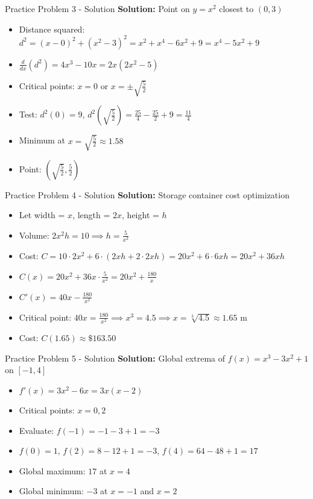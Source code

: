 \documentclass[aspectratio=169]{beamer}
\begin{document}
\begin{frame}{Practice Problem 3 - Solution}
\textbf{Solution:} Point on $y = x^2$ closest to $(0,3)$

\begin{itemize}
    \item Distance squared: $d^2 = (x-0)^2 + (x^2-3)^2 = x^2 + x^4 - 6x^2 + 9 = x^4 - 5x^2 + 9$
    \item $\frac{d}{dx}(d^2) = 4x^3 - 10x = 2x(2x^2 - 5)$
    \item Critical points: $x = 0$ or $x = \pm\sqrt{\frac{5}{2}}$
    \item Test: $d^2(0) = 9$, $d^2(\sqrt{\frac{5}{2}}) = \frac{25}{4} - \frac{25}{2} + 9 = \frac{11}{4}$
    \item Minimum at $x = \sqrt{\frac{5}{2}} \approx 1.58$
    \item Point: $(\sqrt{\frac{5}{2}}, \frac{5}{2})$
\end{itemize}
\end{frame}

\begin{frame}{Practice Problem 4 - Solution}
\textbf{Solution:} Storage container cost optimization

\begin{itemize}
    \item Let width = $x$, length = $2x$, height = $h$
    \item Volume: $2x^2 h = 10 \implies h = \frac{5}{x^2}$
    \item Cost: $C = 10 \cdot 2x^2 + 6 \cdot (2xh + 2 \cdot 2xh) = 20x^2 + 6 \cdot 6xh = 20x^2 + 36xh$
    \item $C(x) = 20x^2 + 36x \cdot \frac{5}{x^2} = 20x^2 + \frac{180}{x}$
    \item $C'(x) = 40x - \frac{180}{x^2}$
    \item Critical point: $40x = \frac{180}{x^2} \implies x^3 = 4.5 \implies x = \sqrt[3]{4.5} \approx 1.65$ m
    \item Cost: $C(1.65) \approx \$163.50$
\end{itemize}
\end{frame}

\begin{frame}{Practice Problem 5 - Solution}
\textbf{Solution:} Global extrema of $f(x) = x^3 - 3x^2 + 1$ on $[-1,4]$

\begin{itemize}
    \item $f'(x) = 3x^2 - 6x = 3x(x-2)$
    \item Critical points: $x = 0, 2$
    \item Evaluate: $f(-1) = -1 - 3 + 1 = -3$
    \item $f(0) = 1$, $f(2) = 8 - 12 + 1 = -3$, $f(4) = 64 - 48 + 1 = 17$
    \item Global maximum: $17$ at $x = 4$
    \item Global minimum: $-3$ at $x = -1$ and $x = 2$
\end{itemize}
\end{frame}
\end{document}
